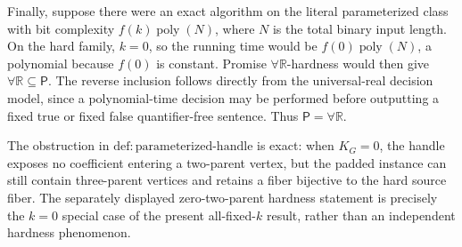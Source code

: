 Finally, suppose there were an exact algorithm on the literal parameterized class with bit complexity \(f(k)\operatorname{poly}(N)\), where \(N\) is the total binary input length. On the hard family, \(k=0\), so the running time would be \(f(0)\operatorname{poly}(N)\), a polynomial because \(f(0)\) is constant. Promise \(\forall\mathbb R\)-hardness would then give \(\forall\mathbb R\subseteq\mathsf P\). The reverse inclusion follows directly from the universal-real decision model, since a polynomial-time decision may be performed before outputting a fixed true or fixed false quantifier-free sentence. Thus \(\mathsf P=\forall\mathbb R\).

The obstruction in \(\mathrm{def:parameterized\mbox{-}handle}\) is exact: when \(K_G=0\), the handle exposes no coefficient entering a two-parent vertex, but the padded instance can still contain three-parent vertices and retains a fiber bijective to the hard source fiber. The separately displayed zero-two-parent hardness statement is precisely the \(k=0\) special case of the present all-fixed-\(k\) result, rather than an independent hardness phenomenon.
